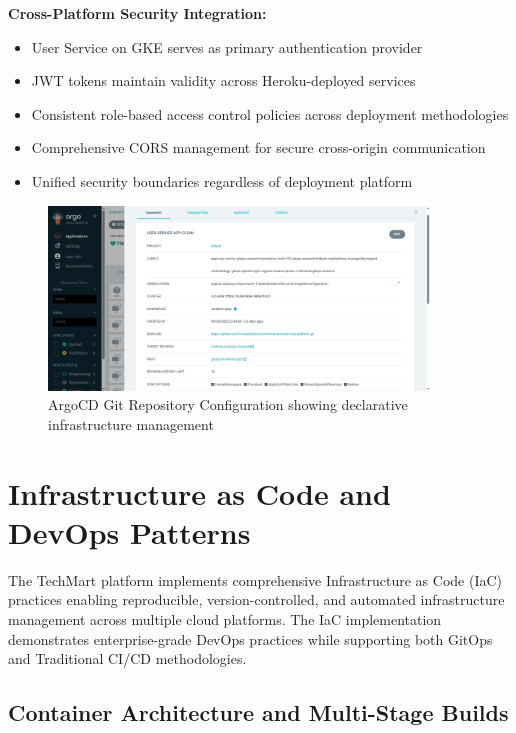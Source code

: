 \textbf{Cross-Platform Security Integration:}
\begin{itemize}
\item User Service on GKE serves as primary authentication provider
\item JWT tokens maintain validity across Heroku-deployed services
\item Consistent role-based access control policies across deployment methodologies
\item Comprehensive CORS management for secure cross-origin communication
\item Unified security boundaries regardless of deployment platform
\end{itemize}

\begin{figure}[H]
\centering
\includegraphics[width=0.9\textwidth]{figures/chapter4/argocd-git-repository-config.png}
\caption{ArgoCD Git Repository Configuration showing declarative infrastructure management}
\label{fig:argocd-git-repository-config}
\end{figure}

\section{Infrastructure as Code and DevOps Patterns}

The TechMart platform implements comprehensive Infrastructure as Code (IaC) practices enabling reproducible, version-controlled, and automated infrastructure management across multiple cloud platforms. The IaC implementation demonstrates enterprise-grade DevOps practices while supporting both GitOps and Traditional CI/CD methodologies.

\subsection{Container Architecture and Multi-Stage Builds}

